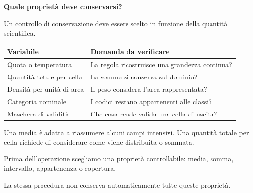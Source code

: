 \documentclass[12pt,aspectratio=1610]{beamer}
\newcommand{\PBody}[1]{\par{\fontsize{11.3}{14.8}\selectfont #1\par}}
\newcommand{\PSmall}[1]{\par{\fontsize{9.8}{13.1}\selectfont #1\par}}
\newcommand{\PInfo}[1]{%
\begin{tcolorbox}[enhanced,arc=1.6mm,boxrule=.55pt,colback=GeoTint,
 colframe=Rule!80!Classical,left=2.3mm,right=2.3mm,top=2mm,bottom=2mm,
 before skip=1mm,after skip=1mm]
\PSmall{#1}\end{tcolorbox}}
\begin{document}
\begin{frame}[plain]\hypertarget{slide42}{}
\begin{lrbox}{\TitleBox}
\begin{minipage}[t]{17.7cm}\raggedright\color{Ink}\fontsize{11.3}{14.8}\selectfont
\color{Navy}\bfseries\fontsize{20.6}{24.5}\selectfont Quale proprietà deve conservarsi?
\end{minipage}\end{lrbox}

\begin{lrbox}{\RecallBox}
\begin{minipage}[t]{14.3cm}\raggedright\color{Ink}\fontsize{11.3}{14.8}\selectfont
\fontsize{10.3}{13.8}\selectfont Un controllo di conservazione deve essere scelto in funzione della quantità scientifica.
\end{minipage}\end{lrbox}

\begin{lrbox}{\PilotLeftBox}
\begin{minipage}[t]{10.05cm}\raggedright\color{Ink}\fontsize{11.3}{14.8}\selectfont
{\fontsize{10.2}{13.1}\selectfont\renewcommand{\arraystretch}{1.45}\begin{tabular}{@{}p{4.0cm}p{5.0cm}@{}}\toprule
\textbf{Variabile} & \textbf{Domanda da verificare}\\\midrule
Quota o temperatura & La regola ricostruisce una grandezza continua?\\
Quantità totale per cella & La somma si conserva sul dominio?\\
Densità per unità di area & Il peso considera l’area rappresentata?\\
Categoria nominale & I codici restano appartenenti alle classi?\\
Maschera di validità & Che cosa rende valida una cella di uscita?\\
\bottomrule\end{tabular}}

\end{minipage}\end{lrbox}

\begin{lrbox}{\PilotRightBox}
\begin{minipage}[t]{7.55cm}\raggedright\color{Ink}\fontsize{11.3}{14.8}\selectfont
\PBody{Una media è adatta a riassumere alcuni campi intensivi. Una quantità totale per cella richiede di considerare come viene distribuita o sommata.}
\vspace{2.5mm}
\PInfo{Prima dell’operazione scegliamo una proprietà controllabile: media, somma, intervallo, appartenenza o copertura.}
\PBody{La stessa procedura non conserva automaticamente tutte queste proprietà.}
\vspace{2.5mm}


\end{minipage}
\end{lrbox}
\end{frame}
\end{document}
